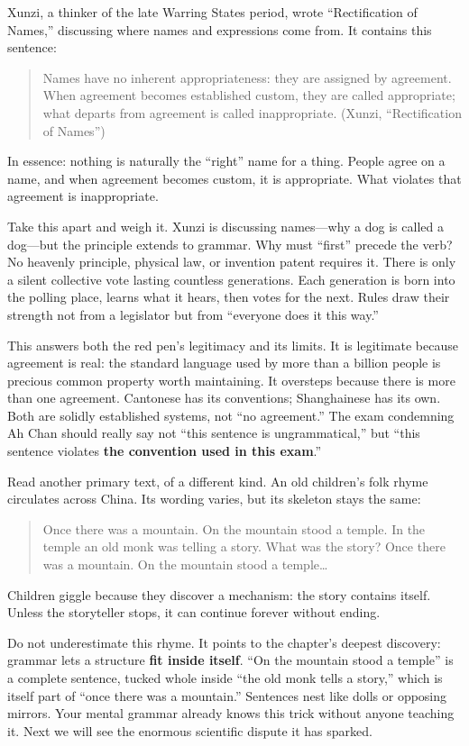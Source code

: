 Xunzi, a thinker of the late Warring States period, wrote ``Rectification of Names,'' discussing where names and expressions come from. It contains this sentence:

\begin{quote}
Names have no inherent appropriateness: they are assigned by agreement. When agreement becomes established custom, they are called appropriate; what departs from agreement is called inappropriate. (Xunzi, ``Rectification of Names'')
\end{quote}
In essence: nothing is naturally the ``right'' name for a thing. People agree on a name, and when agreement becomes custom, it is appropriate. What violates that agreement is inappropriate.

Take this apart and weigh it. Xunzi is discussing names---why a dog is called a dog---but the principle extends to grammar. Why must ``first'' precede the verb? No heavenly principle, physical law, or invention patent requires it. There is only a silent collective vote lasting countless generations. Each generation is born into the polling place, learns what it hears, then votes for the next. Rules draw their strength not from a legislator but from ``everyone does it this way.''

This answers both the red pen's legitimacy and its limits. It is legitimate because agreement is real: the standard language used by more than a billion people is precious common property worth maintaining. It oversteps because there is more than one agreement. Cantonese has its conventions; Shanghainese has its own. Both are solidly established systems, not ``no agreement.'' The exam condemning Ah Chan should really say not ``this sentence is ungrammatical,'' but ``this sentence violates \textbf{the convention used in this exam}.''

Read another primary text, of a different kind. An old children's folk rhyme circulates across China. Its wording varies, but its skeleton stays the same:

\begin{quote}
Once there was a mountain. On the mountain stood a temple. In the temple an old monk was telling a story. What was the story? Once there was a mountain. On the mountain stood a temple\ldots{}
\end{quote}
Children giggle because they discover a mechanism: the story contains itself. Unless the storyteller stops, it can continue forever without ending.

Do not underestimate this rhyme. It points to the chapter's deepest discovery: grammar lets a structure \textbf{fit inside itself}. ``On the mountain stood a temple'' is a complete sentence, tucked whole inside ``the old monk tells a story,'' which is itself part of ``once there was a mountain.'' Sentences nest like dolls or opposing mirrors. Your mental grammar already knows this trick without anyone teaching it. Next we will see the enormous scientific dispute it has sparked.

